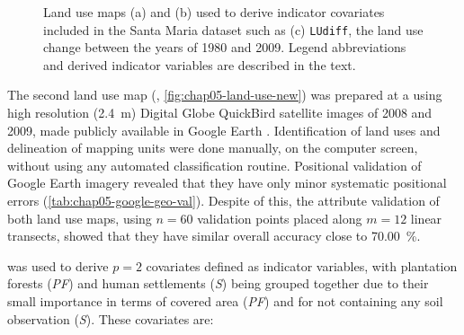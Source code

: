 \begin{figure}[!ht]
\begin{minipage}[b]{0.45\textwidth}
\end{minipage}
\caption[Land use maps included in the Santa Maria dataset.]{Land use maps (a) \landOld{} and (b) \landNew{} 
used to derive indicator covariates included in the Santa Maria dataset such as (c) \texttt{LUdiff}, the land 
use change between the years of 1980 and 2009. Legend abbreviations and derived indicator variables are 
described in the text.}
\label{fig:chap05-land-use}
\end{figure}

The second land use map (\landNew{}, \autoref{fig:chap05-land-use-new}) was prepared at a  using 
high resolution (\SI{2.4}{\m}) Digital Globe\rr{} QuickBird satellite images of \num{2008} and \num{2009}, 
made publicly available in Google Earth\rr{} \cite{SamuelRosaEtAl2011a}. Identification of land uses and 
delineation of mapping units were done manually, on the computer screen, without using any automated 
classification routine. Positional validation of Google Earth\rr{} imagery revealed that they have only minor 
systematic positional errors (\autoref{tab:chap05-google-geo-val}). Despite of this, the attribute validation 
of both land use maps, using $n = 60$ validation points placed along $m = 12$ linear transects, showed that 
they have similar overall accuracy close to \SI{70.00}{\percent}.


\landOld{} was used to derive $p = 2$ covariates defined as indicator variables, with plantation forests 
(\textit{PF}) and human settlements (\textit{S}) being grouped together due to their small importance in terms 
of covered area (\textit{PF}) and for not containing any soil observation (\textit{S}). These covariates are:

